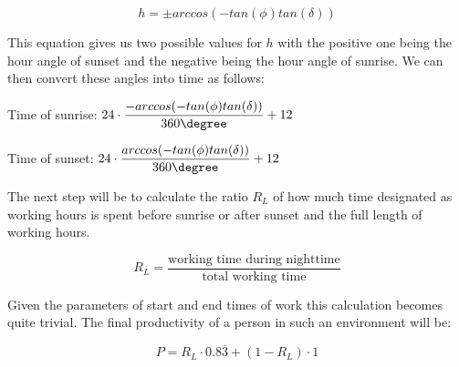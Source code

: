 $$h=\pm arccos(-tan(\phi)tan(\delta))$$

This equation gives us two possible values for $h$ with the positive one being the hour angle of sunset and the negative being the hour angle of sunrise. We can then convert these angles into time as follows:
\begin{center}
Time of sunrise: $24\cdot \dfrac{-arccos(-tan(\phi)tan(\delta))}{360\degree}+12$
\end{center}
\begin{center}
Time of sunset: $24\cdot \dfrac{arccos(-tan(\phi)tan(\delta))}{360\degree}+12$
\end{center}
The next step will be to calculate the ratio $R_L$ of how much time designated as working hours is spent before sunrise or after sunset and the full length of working hours.

$$R_L = \frac{\text{working time during nighttime}}{\text{total working time}}$$

Given the parameters of start and end times of work this calculation becomes quite trivial. The final productivity of a person in such an environment will be:

$$P=R_L \cdot 0.8\overline{3}+(1-R_L)\cdot 1$$










